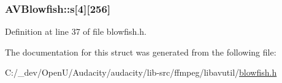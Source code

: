 \subsubsection[{\texorpdfstring{s}{s}}]{ A\+V\+Blowfish\+::s\mbox{[}4\mbox{]}\mbox{[}256\mbox{]}}\hypertarget{struct_a_v_blowfish_abf6f8773f7f25b320439df6a75cd909c}{}\label{struct_a_v_blowfish_abf6f8773f7f25b320439df6a75cd909c}


Definition at line 37 of file blowfish.\+h.



The documentation for this struct was generated from the following file\+:\begin{DoxyCompactItemize}
\item 
C\+:/\+\_\+dev/\+Open\+U/\+Audacity/audacity/lib-\/src/ffmpeg/libavutil/\hyperlink{blowfish_8h}{blowfish.\+h}\end{DoxyCompactItemize}
